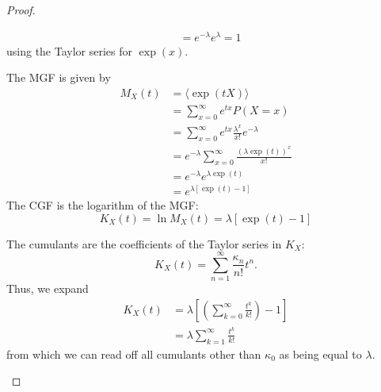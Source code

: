 \begin{proof}
\begin{parts}
\begin{align*}
			&= e^{-\lambda} e^{\lambda} = 1
		\end{align*}
		using the Taylor series for $\exp(x)$.
	\item The MGF is given by
		\begin{align*}
			M_X(t) &= \langle \exp(tX)\rangle\\
			&= \sum_{x=0}^{\infty} e^{tx}P(X=x)\\\
			&= \sum_{x=0}^{\infty} e^{tx} \frac{\lambda^x}{x!}e^{-\lambda}\\
			&= e^{-\lambda}\sum_{x=0}^{\infty}  \frac{(\lambda\exp(t))^x}{x!}\\
			&= e^{-\lambda} e^{\lambda \exp(t)}\\
			&= e^{\lambda[\exp(t)-1]}
		\end{align*}
		The CGF is the logarithm of the MGF:
		\[
			K_X(t)=\ln M_X(t)=\lambda[\exp(t)-1]
			\]
		\item The cumulants are the coefficients of the Taylor series in $K_X$:
			\[
			K_X(t) =\sum_{n=1}^{\infty} \frac{\kappa_n}{n!}t^n
			.\] 
			Thus, we expand
			\begin{align*}
				K_X(t) &= \lambda \left[ \left(\sum_{k=0}^{\infty} \frac{t^k}{k!}\right)-1 \right] \\
				&=\lambda \sum_{k=1}^{\infty} \frac{t^k}{k!}
			\end{align*}
			from which we can read off all cumulants other than $\kappa_0$ as being equal to $\lambda$.\qedhere
	\end{parts}
\end{proof}

